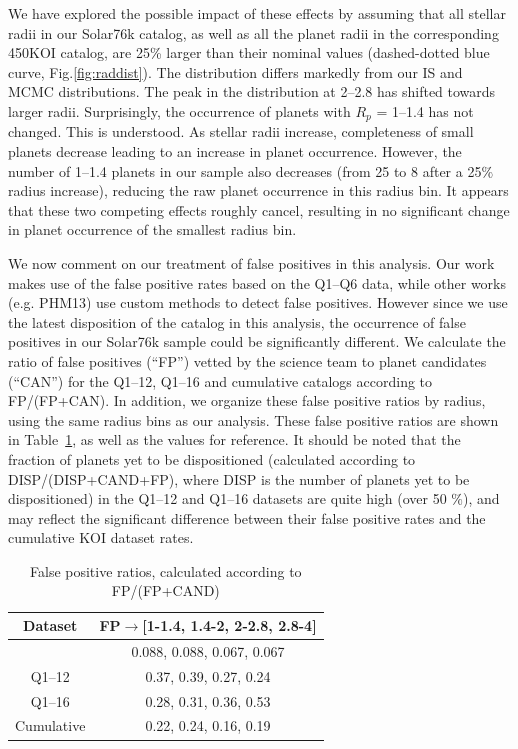 We have explored the possible impact of these effects by assuming
that all stellar radii in our Solar76k catalog, as well as all
the planet radii in the corresponding 450KOI catalog, are 25\% larger
than their nominal values (dashed-dotted blue curve, Fig.\ref{fig:raddist}). 
The distribution differs markedly from our IS and MCMC distributions. 
The peak in the distribution at 2--2.8\rearth{} has shifted towards
larger radii.  Surprisingly, the occurrence of planets with $R_p$ =
1--1.4\rearth{} has not changed.  This is understood. As stellar
radii increase, completeness of small planets decrease leading to an
increase in planet occurrence. However, the number of 1--1.4\rearth{}
planets in our sample also decreases (from 25 to 8 after a 25$\%$
radius increase), reducing the raw planet
occurrence in this radius bin. It appears that these two competing
effects roughly cancel, resulting in no significant change in planet
occurrence of the smallest radius bin. 

We now comment on our treatment of false positives in this analysis. 
Our work makes use of the \citet{Fressin2013} false positive rates based 
on the Q1--Q6 \kep{} data, while other works (e.g. PHM13) use custom 
methods to detect false positives. 
However since we use the latest disposition of the \kep{} catalog in this analysis,
the occurrence of false positives in our Solar76k sample could be significantly
different. We calculate the ratio of false positives (``FP'') vetted by the
\kep{} science team to planet candidates (``CAN'') for the Q1--12, Q1--16 and
cumulative \kep{} catalogs according 
to FP/(FP+CAN). In addition, we organize these false positive ratios by radius, 
using the same radius bins as our analysis. These false positive ratios are shown 
in Table~\ref{tab:fp}, as well as the \citet{Fressin2013} values for reference. 
It should be noted that the fraction of planets yet to be 
dispositioned (calculated according to DISP/(DISP+CAND+FP), where DISP is the 
number of planets yet to be dispositioned) in the Q1--12 and Q1--16 datasets are quite high 
(over 50 $\%$), and may reflect the significant difference between their false positive rates 
and the cumulative KOI dataset rates. 

\begin{table}[h]
\centering
\caption{False positive ratios, calculated according to FP/(FP+CAND)}
\begin{tabular}{c|c}\hline Dataset  & FP$\rightarrow$[1-1.4, 1.4-2, 2-2.8, 2.8-4]\rearth{} \\\hline
\citet{Fressin2013} & 0.088, 0.088, 0.067, 0.067 \\
Q1--12             & 0.37, 0.39, 0.27, 0.24 \\
Q1--16             & 0.28, 0.31, 0.36, 0.53  \\
Cumulative      & 0.22, 0.24, 0.16, 0.19 \\
\hline
\end{tabular}
\label{tab:fp}
\end{table}

